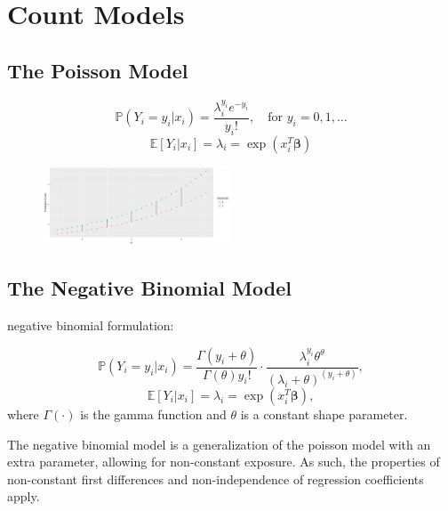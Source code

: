 \documentclass[jou, apacite]{apa6}
\begin{document}
\section{Count Models}

\subsection{The Poisson Model}

\begin{equation} \label{pois1}
\mathbb{P}(Y_i = y_i|x_i) = \dfrac{\lambda_i^{y_i}e^{-y_i}}{y_i!}, \quad\text{for } y_i = 0, 1, \dots
\end{equation}
\begin{equation} \label{pois2}
\mathbb{E}[Y_i|x_i] = \lambda_i = \exp (x_i^T \bm{\beta})
\end{equation}

\begin{figure}[h]
\includegraphics[width=0.5\textwidth]{PoissonFirstDiff.png}
\end{figure}

\subsection{The Negative Binomial Model}

negative binomial formulation:

\begin{equation}
\mathbb{P}(Y_i = y_i | x_i) = \dfrac{\Gamma(y_i + \theta)}{\Gamma(\theta)y_i!}
  \cdot
  \dfrac{\lambda_i^{y_i}\theta^{\theta}}{(\lambda_i + \theta)^{(y_i + \theta)}},
\end{equation}
\begin{equation}
\mathbb{E}[Y_i|x_i] = \lambda_i = \exp (x_i^T \bm{\beta}),
\end{equation}
where $\Gamma(\cdot)$ is the gamma function and $\theta$ is a constant shape parameter.

The negative binomial model is a generalization of the poisson model with an extra parameter, allowing for non-constant exposure. As such, the properties of non-constant first differences and non-independence of regression coefficients apply. 
\end{document}
